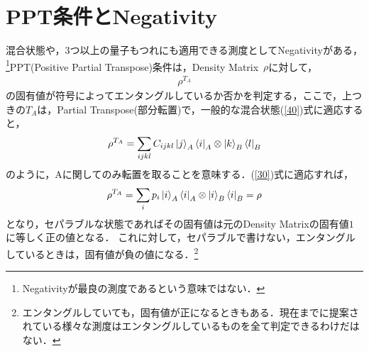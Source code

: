 \section{PPT条件とNegativity}
混合状態や，3つ以上の量子もつれにも適用できる測度としてNegativityがある，\footnote{Negativityが最良の測度であるという意味ではない．}PPT(Positive Partial Transpose)条件は，Density Matrix\ $\rho$に対して，
\begin{eqnarray}
\label{5}
\rho^{T_{A}}
\end{eqnarray}
の固有値が符号によってエンタングルしているか否かを判定する，ここで，上つきの$T_{A}$は，Partial Transpose(部分転置)で，一般的な混合状態(\ref{40})式に適応すると，
\begin{eqnarray}
\label{6}
\rho^{T_{A}}=\sum_{ijkl}C_{ijkl}\ket{j}_A\bra{i}_{A}\otimes\ket{k}_B\bra{l}_{B}
\end{eqnarray}
のように，Aに関してのみ転置を取ることを意味する．(\ref{30})式に適応すれば，
\begin{eqnarray}
\rho^{T_{A}}=\sum_{i}p_{i}\ket{i}_A\bra{i}_{A}\otimes\ket{i}_B\bra{i}_{B}=\rho
\end{eqnarray}
となり，セパラブルな状態であればその固有値は元のDensity Matrixの固有値$1$に等しく正の値となる．
これに対して，セパラブルで書けない，エンタングルしているときは，固有値が負の値になる．\footnote{エンタングルしていても，固有値が正になるときもある．現在までに提案されている様々な測度はエンタングルしているものを全て判定できるわけだはない．}
